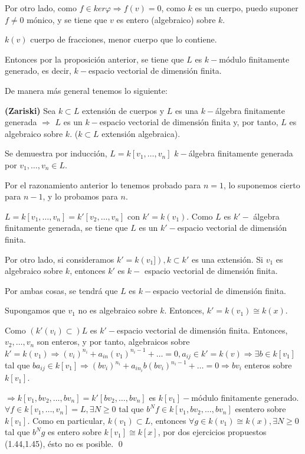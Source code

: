Por otro lado, como $f\in ker\varphi \Rightarrow f(v)=0$, como $k$ es un cuerpo, puedo suponer $f\neq 0$ mónico, y se tiene que $v$ es entero (algebraico) sobre $k$.

\begin{nota}
$k(v)$ cuerpo de fracciones, menor cuerpo que lo contiene.
\end{nota}

Entonces por la proposición anterior, se tiene que $L$ es $k-$módulo finitamente generado, es decir, $k-$espacio vectorial de dimensión finita.

De manera más general tenemos lo siguiente: 

\begin{Prop}
\textbf{(Zariski)} Sea $k\subset L$ extensión de cuerpos y $L$ es una $k-$álgebra finitamente generada $\Rightarrow$ $L$ es un $k-$espacio vectorial de dimensión finita y, por tanto, $L$ es algebraico sobre $k$. ($k\subset L$ extensión algebraica).
\end{Prop}

\begin{Dem}
Se demuestra por inducción, $L=k[v_1,\dots,v_n]$ $k-$álgebra finitamente generada por $v_1,\dots,v_n\in L$.

Por el razonamiento anterior lo tenemos probado para $n=1$, lo suponemos cierto para $n-1$, y lo probamos para $n$.

$L=k[v_1,\dots,v_n]=k'[v_2,\dots,v_n]$ con $k'=k(v_1)$. Como $L$ es $k'-$ álgebra finitamente generada, se tiene que $L$ es un $k'-$espacio vectorial de dimensión finita. 

Por otro lado, si consideramos $k'=k(v_1]), k\subset k'$ es una extensión. Si $v_1$ es algebraico sobre $k$, entonces $k'$ es $k-$ espacio vectorial de dimensión finita. 

Por ambas cosas, se tendrá que $L$ es $k-$espacio vectorial de dimensión finita.

Supongamos que $v_1$ no es algebraico sobre $k$. Entonces, $k'=k(v_1) \cong k(x)$. 

Como $(k'(v_i)\subset)L$ es $k'-$espacio vectorial de dimensión finita. Entonces, $v_2,\dots,v_n$ son enteros, y por tanto, algebraicos sobre $k'=k(v_1) \Rightarrow (v_i)^{n_i}+a_{in}(v_1)^{n_i-1}+\dots=0,a_{ij}\in k'=k(v) \Rightarrow \exists b\in k[v_1]$ tal que $ba_{ij}\in k[v_1] \Rightarrow (bv_i)^{n_i}+a_{in_i}b(bv_i)^{n_i-1}+\dots =0 \Rightarrow bv_i$ enteros sobre $k[v_1]$.

$\Rightarrow k[v_1,bv_2,\dots,bv_n]=k'[bv_2,\dots,bv_n]$ es $k[v_1]-$módulo finitamente generado. $\forall f\in k[v_1,\dots,v_n]=L, \exists N\ge 0$ tal que $b^Nf \in k[v_1,bv_2,\dots,bv_n]$ esentero sobre $k[v_1]$. Como en particular, $k(v_1)\subset L$, entonces $\forall g\in k(v_1) \cong k(x),\exists N\ge 0$ tal que $b^Ng$ es entero sobre $k[v_1]\cong k[x]$, por dos ejercicios propuestos (1.44,1.45), ésto no es posible. \qed
\end{Dem}

